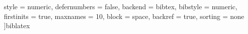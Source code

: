     style           = numeric,
    defernumbers    = false,
    backend         = bibtex,
    bibstyle        = numeric,
    firstinits      = true,
    maxnames        = 10,
    block           = space,
    backref         = true,
    sorting         = none
]{biblatex}                 %
\usepackage{xpatch}         %
\usepackage{xurl}           %
\usepackage[
    \compiler,
    bookmarks    = true,
    pdftoolbar   = true,
    pdfmenubar   = true,
    pdffitwindow = false,
    colorlinks   = true,
    linkcolor    = \linkColor,
    citecolor    = \citeColor,
    filecolor    = \fileColor,
    urlcolor     = \urlColor
]{hyperref}                 %



\geometry{bindingoffset=0.75cm}


\parskip=0.4cm
\renewcommand{\arraystretch}{1.25}
\setlength{\cftbeforetoctitleskip}{-0.4cm}
\setlength{\cftbeforeloftitleskip}{-0.4cm}
\setlength{\cftbeforelottitleskip}{-0.4cm}
\setlength{\cftbeforechapskip}{0.5cm}
\setlength{\cftbeforesecskip}{0.2cm}
\setlength{\cftbeforesubsecskip}{0.2cm}
\setlength{\cftbeforesubsubsecskip}{0.3cm}
\setlength{\cftbeforefigskip}{0.3cm}
\setlength{\cftbeforetabskip}{0.3cm}


